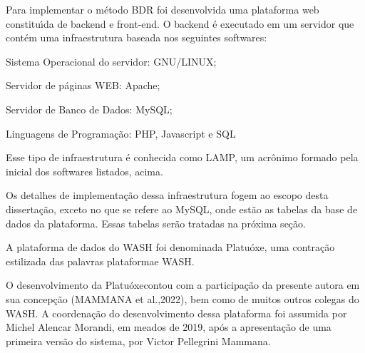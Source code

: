 \documentclass[
12pt,		%
openright,	%
twoside,  %
a4paper,			%
chapter=TITLE,		%
english,			%
french,				%
spanish,			%
brazil				%
]{USPSC-classe/USPSC}
\begin{document}
Para implementar o m\'etodo BDR foi desenvolvida uma plataforma web constitu\'{\i}da de backend e front-end. O backend \'e executado em um servidor que cont\'em uma infraestrutura baseada nos seguintes softwares:










\begin{alineas}
\item Sistema Operacional do servidor: GNU/LINUX;
\item Servidor de p\'aginas WEB: Apache;
\item Servidor de Banco de Dados: MySQL;
\item Linguagens de Programa\c{c}\~ao: PHP, Javascript e SQL
\end{alineas}

Esse tipo de infraestrutura \'e conhecida como LAMP, um acr\^onimo formado pela inicial dos softwares listados, acima.









Os detalhes de implementa\c{c}\~ao dessa infraestrutura fogem ao escopo desta disserta\c{c}\~ao, exceto no que se refere ao MySQL, onde est\~ao as tabelas da base de dados da plataforma. Essas tabelas ser\~ao tratadas na pr\'oxima se\c{c}\~ao.









A plataforma de dados do WASH foi denominada \textquotedbl Platu\'oxe\textquotedbl , uma contra\c{c}\~ao estilizada das palavras \textquotedbl plataforma\textquotedbl  e \textquotedbl WASH\textquotedbl .









O desenvolvimento da \textquotedbl Platu\'oxe\textquotedbl  contou com a participa\c{c}\~ao da presente autora em sua concep\c{c}\~ao  (MAMMANA et al.,2022), bem como de muitos outros colegas do WASH. A coordena\c{c}\~ao do desenvolvimento dessa plataforma foi assumida por Michel Alencar Morandi, em meados de 2019, ap\'os a apresenta\c{c}\~ao de uma primeira vers\~ao do sistema, por Victor Pellegrini Mammana.
\end{document}
